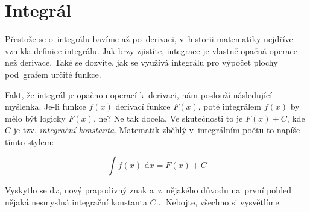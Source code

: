 \chapter{Integrál}

Přestože se o~integrálu bavíme až po~derivaci, v~historii matematiky nejdříve vznikla definice integrálu. Jak brzy zjistíte, integrace je vlastně opačná operace než derivace. Také se dozvíte, jak se využívá integrálu pro výpočet plochy pod~grafem určité funkce.

Fakt, že integrál je opačnou operací k~derivaci, nám poslouží následující myšlenka. Je-li funkce $f(x)$ derivací funkce $F(x)$, poté integrálem $f(x)$ by mělo být logicky $F(x)$, ne? Ne tak docela. Ve skutečnosti to je $F(x) + C$, kde $C$ je tzv. \emph{integrační konstanta}. Matematik zběhlý v~integrálním počtu to napíše tímto stylem:

\begin{equation*}
\int f(x) \text{ d}x = F(x) + C
\end{equation*}

Vyskytlo se $\text{d}x$, nový prapodivný znak a~z~nějakého důvodu na~první pohled nějaká nesmyslná integrační konstanta $C$... Nebojte, všechno si vysvětlíme.

